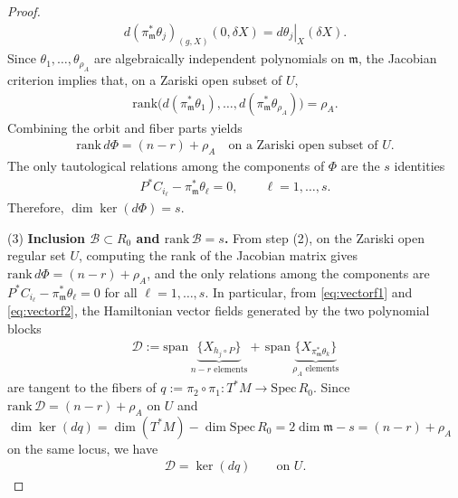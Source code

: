 \documentclass[11pt]{amsart}
\theoremstyle{definition}
\theoremstyle{plain}
\theoremstyle{conclusion}
\begin{document}
\begin{proof}
\begin{align*}
d(\pi_{\mathfrak{m}}^*\theta_j)_{(g,X)}(0,\delta X) = \left.d\theta_j\right\vert_X(\delta X).
\end{align*} Since $\theta_1,\ldots,\theta_{\rho_A}$ are algebraically independent polynomials on $\mathfrak{m}$, the Jacobian criterion  implies that, on a Zariski open subset of $U$, \begin{align}
\mathrm{rank}\bigl(d(\pi_{\mathfrak{m}}^*\theta_1),\ldots,d(\pi_{\mathfrak{m}}^*\theta_{\rho_A})\bigr)=\rho_A . \label{eq:rankid}
\end{align} Combining the orbit and fiber parts yields \begin{align*}
\mathrm{rank}\,d\Phi = (n-r)+\rho_A \quad\text{on a Zariski open subset of }U.
\end{align*} The only tautological relations among the components of $\Phi$ are the $s$ identities \begin{align*}
P^*C_{i_\ell} - \pi_{\mathfrak{m}}^*\theta_\ell = 0,\qquad \ell =1, \ldots,s .
\end{align*} Therefore, $\dim\ker(d\Phi)=s$. 


(3) \textbf{Inclusion $\mathcal{B}\subset R_0$ and $\mathrm{rank} \, \mathcal{B}=s$.}  
From step (2), on the Zariski open regular set $U$, computing the rank of the Jacobian matrix gives $\mathrm{rank} \, d\Phi=(n-r)+\rho_{A}$, and the only relations among the components are $P^*C_{i_\ell}-\pi_\mathfrak{m}^*\theta_{\ell}=0$ for all $\ell=1,\dots,s$. In particular, from \eqref{eq:vectorf1} and \eqref{eq:vectorf2}, the Hamiltonian vector fields generated by the two polynomial blocks \begin{align*}
    \mathcal{D}:=\mathrm{span}\,\underbrace{\{X_{h_j \circ P}\}}_{\text{$n-r$ elements}} + \, \mathrm{span}\,\underbrace{\{X_{\pi^*_\mathfrak{m} \theta_k}\}}_{\text{$\rho_A$ elements}} 
\end{align*}
are tangent to the fibers of $q:=\pi_2\circ\pi_1:T^*M\to\mathrm{Spec} \, R_0$. Since $\mathrm{rank}\,\mathcal{D}=(n-r)+\rho_A$ on $U$ and $\dim\ker(dq)=\dim(T^*M)-\dim\mathrm{Spec}\,R_0=2\dim\mathfrak{m}-s=(n-r)+\rho_A$ on the same locus, we have \begin{align*}
    \mathcal{D}=\ker(dq)\qquad\text{on }U.
\end{align*}


\end{proof}
\end{document}
